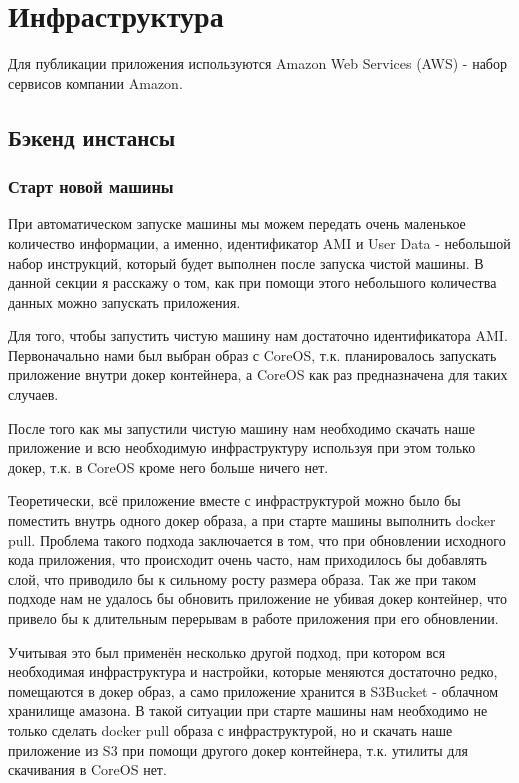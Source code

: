 
\chapter{Инфраструктура}

Для публикации приложения используются Amazon Web Services (AWS) - набор сервисов компании Amazon.

\section{Бэкенд инстансы}
\subsection{Старт новой машины}
	При автоматическом запуске машины мы можем передать очень маленькое количество информации, а именно, идентификатор AMI и User Data - небольшой набор инструкций, который будет выполнен после запуска чистой машины. В данной секции я расскажу о том, как при помощи этого небольшого количества данных можно запускать приложения.
	
	Для того, чтобы запустить чистую машину нам достаточно идентификатора AMI. Первоначально нами был выбран образ с CoreOS, т.к. планировалось запускать приложение внутри докер контейнера, а CoreOS как раз предназначена для таких случаев.
	
	После того как мы запустили чистую машину нам необходимо скачать наше приложение и всю необходимую инфраструктуру используя при этом только докер, т.к. в CoreOS кроме него больше ничего нет.
	
	Теоретически, всё приложение вместе с инфраструктурой можно было бы поместить внутрь одного докер образа, а при старте машины выполнить docker pull. Проблема такого подхода заключается в том, что при обновлении исходного кода приложения, что происходит очень часто, нам приходилось бы добавлять слой, что приводило бы к сильному росту размера образа. Так же при таком подходе нам не удалось бы обновить приложение не убивая докер контейнер, что привело бы к длительным перерывам в работе приложения при его обновлении.
	
	Учитывая это был применён несколько другой подход, при котором вся необходимая инфраструктура и настройки, которые меняются достаточно редко, помещаются в докер образ, а само приложение хранится в S3Bucket - облачном хранилище амазона. В такой ситуации при старте машины нам необходимо не только сделать docker pull образа с инфраструктурой, но и скачать наше приложение из S3 при помощи другого докер контейнера, т.к. утилиты для скачивания в CoreOS нет.
	
